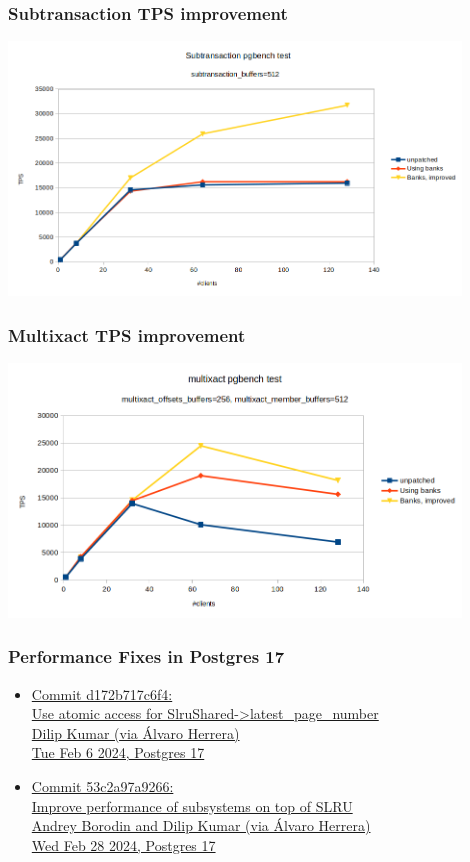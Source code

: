 \begin{frame}
  \frametitle{Subtransaction TPS improvement}
  \includegraphics[width=0.9\textwidth]{subtrans-tps.png}
\end{frame}

\begin{frame}
  \frametitle{Multixact TPS improvement}
  \includegraphics[width=0.9\textwidth]{multixact-tps.png}
\end{frame}


\begin{frame}
  \frametitle{Performance Fixes in Postgres 17}
  \begin{itemize}
    \item {\linksize \href{https://git.postgresql.org/cgit/postgresql.git/commit/?id=d172b717c6f436738cc8383a4e9f611ae227fd93}
      {Commit d172b717c6f4: \faExternalLink \\
      Use atomic access for SlruShared->latest\_page\_number \\
      Dilip Kumar (via Álvaro Herrera) \\
      Tue Feb 6 2024, Postgres 17}}
      \vspace{0.2cm}
    \item {\linksize \href{https://git.postgresql.org/cgit/postgresql.git/commit/?id=53c2a97a92665be6bd7d70bd62ae6158fe4db96e}
      {Commit 53c2a97a9266: \faExternalLink \\
      Improve performance of subsystems on top of SLRU \\
      Andrey Borodin and Dilip Kumar (via Álvaro Herrera) \\
      Wed Feb 28 2024, Postgres 17}}
  \end{itemize}
\end{frame}


